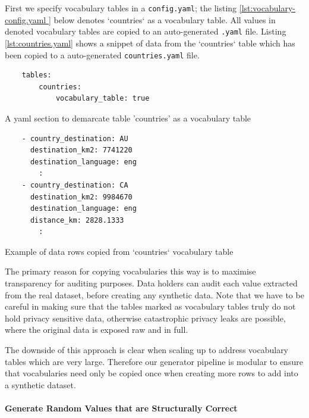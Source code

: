 \documentclass[11pt]{article}
\begin{document}
First we specify vocabulary tables in a \texttt{config.yaml}; the listing \ref{lst:vocabulary-config.yaml } below denotes `countries` as a vocabulary table. All values in denoted vocabulary tables are copied to an auto-generated \texttt{.yaml} file. Listing \ref{lst:countries.yaml} shows a snippet of data from the `countries` table which has been copied to a auto-generated \texttt{countries.yaml} file.

\begin{listing}[H]
\begin{verbatim}
    tables:
        countries:
            vocabulary_table: true
\end{verbatim}
\caption{A yaml section to demarcate table 'countries' as a vocabulary table}
\label{lst:vocabulary-config.yaml }
\end{listing}

\begin{listing}[H]
\begin{verbatim}
    - country_destination: AU
      destination_km2: 7741220
      destination_language: eng
        :
    - country_destination: CA
      destination_km2: 9984670
      destination_language: eng
      distance_km: 2828.1333
        :
\end{verbatim}
\caption{Example of data rows copied from `countries` vocabulary table}
\label{lst:countries.yaml}
\end{listing}

The primary reason for copying vocabularies this way is to maximise transparency for auditing purposes. Data holders can audit each value extracted from the real dataset, before creating any synthetic data. Note that we have to be careful in making sure that the tables marked as vocabulary tables truly do not hold privacy sensitive data, otherwise catastrophic privacy leaks are possible, where the original data is exposed raw and in full. 

The downside of this approach is clear when scaling up to address vocabulary tables which are very large. Therefore our generator pipeline is modular to ensure that vocabularies need only be copied once when creating more rows to add into a synthetic dataset. 

\paragraph{Generate Random Values that are Structurally Correct}
\end{document}
